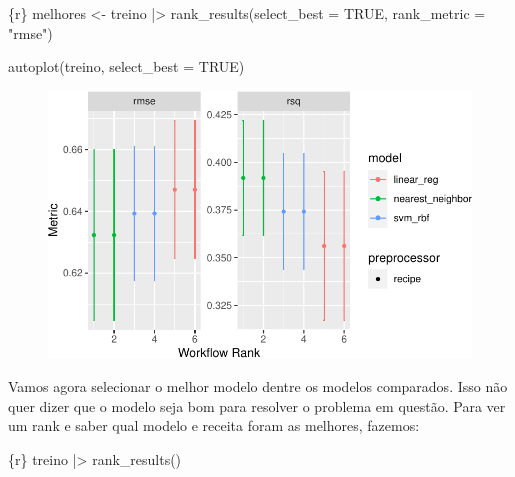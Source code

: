 \documentclass[
  letterpaper,
  DIV=11,
  numbers=noendperiod,
  oneside]{scrartcl}
\newenvironment{Shaded}{\begin{snugshade}}{\end{snugshade}}
\newcommand{\AttributeTok}[1]{\textcolor[rgb]{0.40,0.45,0.13}{#1}}
\newcommand{\ConstantTok}[1]{\textcolor[rgb]{0.56,0.35,0.01}{#1}}
\newcommand{\FunctionTok}[1]{\textcolor[rgb]{0.28,0.35,0.67}{#1}}
\newcommand{\InformationTok}[1]{\textcolor[rgb]{0.37,0.37,0.37}{#1}}
\newcommand{\NormalTok}[1]{\textcolor[rgb]{0.00,0.23,0.31}{#1}}
\newcommand{\OtherTok}[1]{\textcolor[rgb]{0.00,0.23,0.31}{#1}}
\newcommand{\SpecialCharTok}[1]{\textcolor[rgb]{0.37,0.37,0.37}{#1}}
\newcommand{\StringTok}[1]{\textcolor[rgb]{0.13,0.47,0.30}{#1}}
\begin{document}
\begin{Shaded}
\begin{Highlighting}[]
\InformationTok{\textasciigrave{}\textasciigrave{}\textasciigrave{}\{r\}}
\NormalTok{melhores }\OtherTok{\textless{}{-}} 
\NormalTok{  treino }\SpecialCharTok{|\textgreater{}} 
  \FunctionTok{rank\_results}\NormalTok{(}\AttributeTok{select\_best =} \ConstantTok{TRUE}\NormalTok{, }\AttributeTok{rank\_metric =} \StringTok{"rmse"}\NormalTok{)}

\FunctionTok{autoplot}\NormalTok{(treino, }\AttributeTok{select\_best =} \ConstantTok{TRUE}\NormalTok{)}
\InformationTok{\textasciigrave{}\textasciigrave{}\textasciigrave{}}
\end{Highlighting}
\end{Shaded}

\begin{figure}[H]

{\centering \includegraphics{tufte_svm_regressao_files/figure-pdf/unnamed-chunk-18-1.pdf}

}

\end{figure}

Vamos agora selecionar o melhor modelo dentre os modelos comparados.
Isso não quer dizer que o modelo seja bom para resolver o problema em
questão. Para ver um rank e saber qual modelo e receita foram as
melhores, fazemos:

\begin{Shaded}
\begin{Highlighting}[]
\InformationTok{\textasciigrave{}\textasciigrave{}\textasciigrave{}\{r\}}
\NormalTok{treino }\SpecialCharTok{|\textgreater{}} 
  \FunctionTok{rank\_results}\NormalTok{()}
\InformationTok{\textasciigrave{}\textasciigrave{}\textasciigrave{}}
\end{Highlighting}
\end{Shaded}
\end{document}
